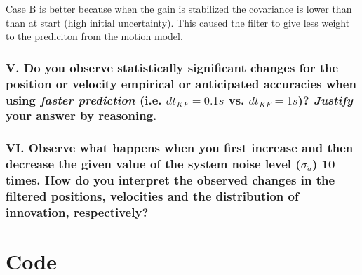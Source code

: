 \documentclass{article}
\begin{document}
Case B is better because when the gain is stabilized the covariance is lower than than at start (high initial uncertainty).
This caused the filter to give less weight to the prediciton from the motion model.

\subsubsection*{V. Do you observe statistically significant changes for the position or velocity
empirical or anticipated accuracies when using \textit{faster prediction} (i.e. $dt_{KF}=0.1s$ vs.
$dt_{KF}=1s$)? \textit{Justify} your answer by reasoning.}

\subsubsection*{VI. Observe what happens when you first increase and then decrease the given value of
the system noise level ($\sigma_{\dot a}$) 10 times. How do you interpret the observed changes
in the filtered positions, velocities and the distribution of innovation, respectively?}

\newpage
\section*{Code}

\end{document}
